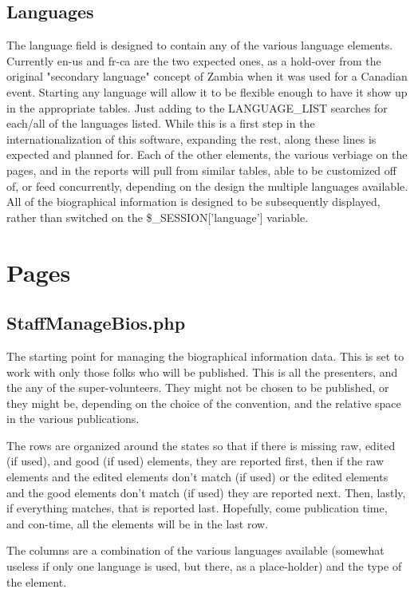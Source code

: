 \documentclass[captions=tablesignature]{scrartcl}
\begin{document}
\subsection{Languages}
\label{sec-2-3}

The language field is designed to contain any of the various
language elements.  Currently en-us and fr-ca are the two expected
ones, as a hold-over from the original "secondary language" concept
of Zambia when it was used for a Canadian event.  Starting any
language will allow it to be flexible enough to have it show up in
the appropriate tables.  Just adding to the LANGUAGE\_LIST searches
for each/all of the languages listed.  While this is a first step
in the internationalization of this software, expanding the rest,
along these lines is expected and planned for.  Each of the other
elements, the various verbiage on the pages, and in the reports
will pull from similar tables, able to be customized off of, or
feed concurrently, depending on the design the multiple languages
available.  All of the biographical information is designed to be
subsequently displayed, rather than switched on the
\$\_SESSION['language'] variable.

\section{Pages}
\label{sec-3}
\subsection{StaffManageBios.php}
\label{sec-3-1}
\label{StaffManageBios.php}
The starting point for managing the biographical information data.
This is set to work with only those folks who will be published.
This is all the presenters, and the any of the super-volunteers.
They might not be chosen to be published, or they might be,
depending on the choice of the convention, and the relative space
in the various publications.

The rows are organized around the states so that if there is
missing raw, edited (if used), and good (if used) elements, they
are reported first, then if the raw elements and the edited
elements don't match (if used) or the edited elements and the good
elements don't match (if used) they are reported next.  Then,
lastly, if everything matches, that is reported last.  Hopefully,
come publication time, and con-time, all the elements will be in
the last row.

The columns are a combination of the various languages available
(somewhat useless if only one language is used, but there, as a
place-holder) and the type of the element.
\end{document}
